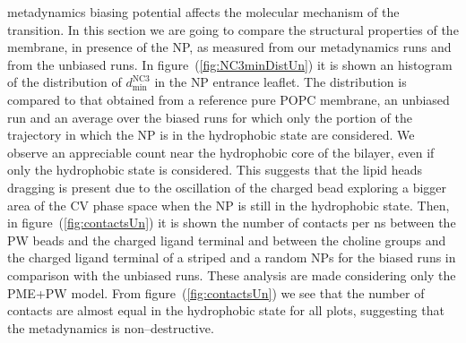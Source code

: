 metadynamics biasing potential affects the molecular mechanism of the transition. In this section we are going to compare the structural properties of the membrane, in presence of the \ac{NP}, as measured from our metadynamics runs and from the unbiased runs. In figure~(\ref{fig:NC3minDistUn}) it is shown an histogram of the distribution of $d_\text{min}^{\text{NC}3}$ in the \ac{NP} entrance leaflet. The distribution is compared to that obtained from a reference pure \ac{POPC} membrane, an unbiased run and an average over the biased runs for which only the portion of the trajectory in which the \ac{NP} is in the hydrophobic state are considered. We observe an appreciable count near the hydrophobic core of the bilayer, even if only the hydrophobic state is considered. This suggests that the lipid heads dragging is present due to the oscillation of the charged bead exploring a bigger area of the \ac{CV} phase space when the \ac{NP} is still in the hydrophobic state. Then, in figure~(\ref{fig:contactsUn}) it is shown the number of contacts per ns between the \ac{PW} beads and the charged ligand terminal and between the choline groups and the charged ligand terminal of a striped and a random \acp{NP} for the biased runs in comparison with the unbiased runs. These analysis are made considering only the \ac{PME}+\ac{PW} model. From figure~(\ref{fig:contactsUn}) we see that the number of contacts are almost equal in the hydrophobic state for all plots, suggesting that the metadynamics is non--destructive.

